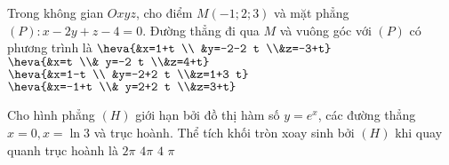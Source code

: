 \begin{ex}%
	Trong không gian $Oxyz$, cho điểm $M(-1; 2; 3)$ và mặt phẳng $(P)\colon  x-2y+z-4=0$. Đường thẳng đi qua $M$ và vuông góc với $(P)$ có phương trình là
	\choice
	{$\heva{&x=1+t \\ &y=-2-2 t \\&z=-3+t}$}
	{\True $\heva{&x=t \\& y=-2 t \\&z=4+t}$}
	{$\heva{&x=1-t \\ &y=-2+2 t \\&z=1+3 t}$}
	{$\heva{&x=-1+t \\& y=2+2 t \\&z=3+t}$}
\end{ex}

\begin{ex}%
	Cho hình phẳng $(H)$ giới hạn bởi đồ thị hàm số $y=e^x$, các đường thẳng $x=0, x=\ln 3$ và trục hoành. Thể tích khối tròn xoay sinh bởi $(H)$ khi quay quanh trục hoành là
	\choice
	{$2 \pi$}
	{\True $4 \pi$}
	{$4$}
	{$\pi$}
\end{ex}


